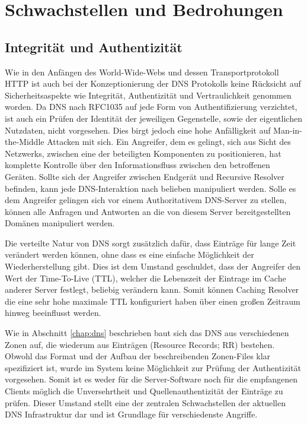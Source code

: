 \chapter{Schwachstellen und Bedrohungen}
\label{chap:threads}


\section{Integrität und Authentizität}
\label{sec:Thread-Auth}

Wie in den Anfängen des World-Wide-Webs und dessen Transportprotokoll HTTP ist auch bei der Konzeptionierung der DNS Protokolls keine Rücksicht auf Sicherheitsaspekte wie Integrität, Authentizität und Vertraulichkeit genommen worden. Da DNS nach RFC1035 auf jede Form von Authentifizierung verzichtet, ist auch ein Prüfen der Identität der jeweiligen Gegenstelle, sowie der eigentlichen Nutzdaten, nicht vorgesehen. Dies birgt jedoch eine hohe Anfälligkeit auf Man-in-the-Middle Attacken mit sich. Ein Angreifer, dem es gelingt, sich aus Sicht des Netzwerks, zwischen eine der beteiligten Komponenten zu positionieren, hat komplette Kontrolle über den Informationsfluss zwischen den betroffenen Geräten. Sollte sich der Angreifer zwischen Endgerät und Recursive Resolver befinden, kann jede DNS-Interaktion nach belieben manipuliert werden. Solle es dem Angreifer gelingen sich vor einem Authoritativem DNS-Server zu stellen, können alle Anfragen und Antworten an die von diesem Server bereitgestellten Domänen manipuliert werden. 

Die verteilte Natur von DNS sorgt zusätzlich dafür, dass Einträge für lange Zeit verändert werden können, ohne dass es eine einfache Möglichkeit der Wiederherstellung gibt. Dies ist dem Umstand geschuldet, dass der Angreifer den Wert der Time-To-Live (TTL), welcher die Lebenszeit der Eintrage im Cache anderer Server festlegt, beliebig verändern kann. Somit können Caching Resolver die eine sehr hohe maximale TTL konfiguriert haben über einen großen Zeitraum hinweg beeinflusst werden.

Wie in Abschnitt \ref{chap:dns} beschrieben baut sich das DNS aus verschiedenen Zonen auf, die wiederum aus Einträgen (Resource Records; RR) bestehen. Obwohl das Format und der Aufbau der beschreibenden Zonen-Files klar spezifiziert ist, wurde im System keine Möglichkeit zur Prüfung der Authentizität vorgesehen. Somit ist es weder für die Server-Software noch für die empfangenen Clients möglich die Unversehrtheit und Quellenauthentizität der Einträge zu prüfen. Dieser Umstand stellt eine der zentralen Schwachstellen der aktuellen DNS Infrastruktur dar und ist Grundlage für verschiedenste Angriffe.

